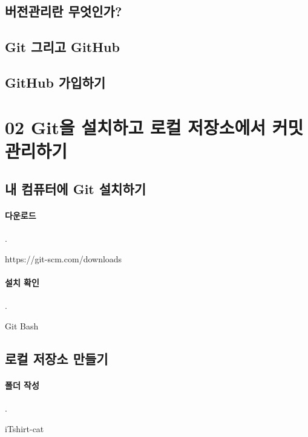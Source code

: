 \documentclass[12pt, a4paper, oneside]{book}
\let\stdsection\section
\renewcommand\section{\newpage\stdsection}
\begin{document}
		\subsection 	{버전관리란 무엇인가?}
		\subsection 	{Git 그리고 GitHub}
		\subsection 	{GitHub 가입하기 }

	\section 	{02 Git을 설치하고 로컬 저장소에서 커밋 관리하기}

		\subsection 	{내 컴퓨터에 Git 설치하기}

			\paragraph{다운로드} 
			.\\
			\begin{tcolorbox}
				https://git-scm.com/downloads
			\end{tcolorbox}

			\paragraph{설치 확인}
			.\\
			\begin{tcolorbox}
				Git Bash
			\end{tcolorbox}


		\subsection 	{로컬 저장소 만들기}

			\paragraph{폴더 작성} 
			.\\

			\begin{tcolorbox}
				iTshirt-cat
			\end{tcolorbox}
\end{document}
